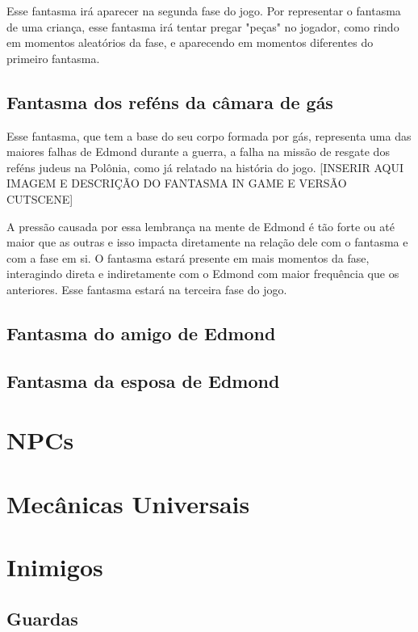 \documentclass{article}
\begin{document}
 Esse fantasma irá aparecer na segunda fase do jogo. Por representar o fantasma de uma criança, esse fantasma irá tentar pregar "peças" no jogador, como rindo em momentos aleatórios da fase, e  aparecendo em momentos diferentes do primeiro fantasma.
 
\subsection{Fantasma dos reféns da câmara de gás}
Esse fantasma, que tem a base do seu corpo formada por gás, representa uma das maiores falhas de Edmond durante a guerra, a falha na missão de resgate dos reféns judeus na Polônia, como já relatado na história do jogo. [INSERIR AQUI IMAGEM E DESCRIÇÃO DO FANTASMA IN GAME E VERSÃO CUTSCENE]

A pressão causada por essa lembrança na mente de Edmond é tão forte ou até maior que as outras e isso impacta diretamente na relação dele com o fantasma e com a fase em si. O fantasma estará presente em mais momentos da fase, interagindo direta e indiretamente com o Edmond com maior frequência que os anteriores. Esse fantasma estará na terceira fase do jogo.

\subsection{Fantasma do amigo de Edmond}


\subsection{Fantasma da esposa de Edmond}

\subsection{}

\section{NPCs}
\section{Mecânicas Universais}
\section{Inimigos}
\subsection{Guardas}
\end{document}
